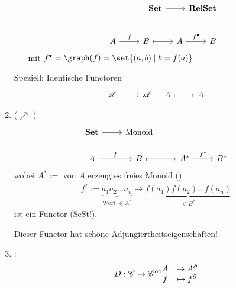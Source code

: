 \begin{beispiel}
\begin{enumerate}
\begin{itemize}
			\begin{align*}
				\begin{tikzcd}[ampersand replacement=\&]
					\Set \arrow[r]                     \& \RelSet                     \\
				\end{tikzcd}\\
				\begin{tikzcd}[ampersand replacement=\&]
					A \arrow[r, "f"] \& B \arrow[r, maps to] \& A \arrow[r, "f^{\bullet}"] \& B
				\end{tikzcd}
			\end{align*}
			mit $f^{\bullet} = \graph(f) = \set{(a,b) \mid b = f(a)}$
		\end{itemize}
		Speziell: Identische Functoren
		\begin{align*}
			\begin{tikzcd}[ampersand replacement=\&]
			\CatA \arrow[r] \& \CatA
			\end{tikzcd}
			\colon
			\begin{tikzcd}[ampersand replacement=\&]
			A \arrow[r, maps to] \& A
			\end{tikzcd}
		\end{align*}
		\item ($\nearrow$ )
			\begin{align*}
				\begin{tikzcd}[ampersand replacement=\&]
				\Set \arrow[r] \& \Monoid\\
				A \arrow[r, "f"] \& B \arrow[r, maps to] \& A^{\ast} \arrow[r, "f^{\ast}"] \& B^{\ast}
				\end{tikzcd}
			\end{align*}
			wobei $A^{\ast}:=$ von $A$ erzeugtes freies Monoid ()
			\begin{align*}
				f^{\ast} := \underbrace{a_1 a_2 \dots a_n}_{\text{Wort } \in A^{\ast}} \longmapsto
				\underbrace{f(a_1)f(a_2)\dots f(a_n)}_{\in B^{\ast}}
			\end{align*}
			ist ein Functor (SeSt!).
			\begin{bemerkung}
				Dieser Functor hat schöne Adjungiertheitseigenschaften!
			\end{bemerkung}
		\item {}:
		\begin{align*}
			D: \mathscr C \to \mathscr C^{\text{op}} \mit \begin{matrix}
			A &\mapsto A^{\partial}\\
			f &\mapsto f^{\partial}

\end{matrix}
\end{align*}
\end{enumerate}
\end{beispiel}
